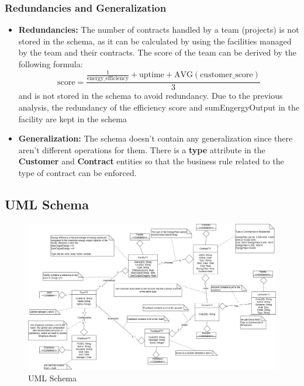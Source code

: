 \subsubsection{Redundancies and Generalization}
\begin{itemize}
    \item \textbf{Redundancies:} The number of contracts handled by a team (projects) is not stored in the schema, as it can be calculated by using the facilities managed by the team and their contracts. The score of the team can be derived by the following formula: \[
\text{score} = \frac{\frac{1}{\text{energy\_efficiency}} + \text{uptime} + \text{AVG}(\text{customer\_score})}{3}
\]
 and is not stored in the schema to avoid redundancy. Due to the previous analysis, the redundancy of the efficiency score and sumEngergyOutput in the facility are kept in the schema
    \item \textbf{Generalization:} The schema doesn't contain any generalization since there aren't different operations for them. There is a \textbf{type} attribute in the \textbf{Customer} and \textbf{Contract} entities so that the business rule related to the type of contract can be enforced.
\end{itemize}


\subsection{UML Schema}

\begin{figure}[H]
    \centering
    \includegraphics[width=\textwidth]{images/UML.png}
    \caption{UML Schema}
\end{figure}
